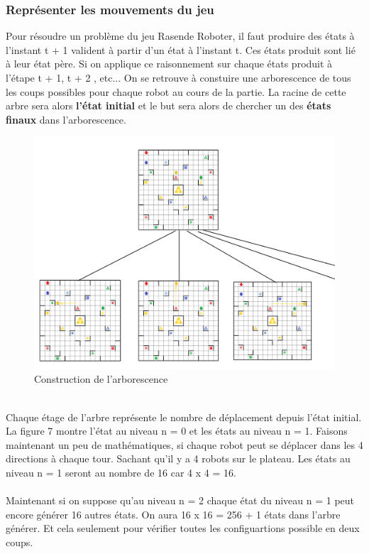 \documentclass{article}
\begin{document}
\subsubsection{Représenter les mouvements du jeu}
Pour résoudre un problème du jeu Rasende Roboter, il faut produire des états à l'instant t + 1 valident à partir d'un état à l'instant t. Ces états produit sont lié à leur état père. Si on applique ce raisonnement sur chaque états produit à l'étape t + 1, t + 2 , etc... On se retrouve à constuire une arborescence de tous les coups possibles pour chaque robot au cours de la partie. La racine de cette arbre sera alors \textbf{l'état initial} et le but sera alors de chercher un des \textbf{états finaux} dans l'arborescence.
\begin{figure}[htbp]
  \centering  
  \includegraphics[width=1\textwidth]{arbre.png}  
  \caption{Construction de l'arborescence} 
  \label{fig:Arborescence}  
\end{figure}\\
Chaque étage de l'arbre représente le nombre de déplacement depuis l'état initial. La figure 7 montre l'état au niveau n = 0 et les états au niveau n = 1. Faisons maintenant un peu de mathématiques, si chaque robot peut se déplacer dans les 4 directions à chaque tour. Sachant qu'il y a 4 robots sur le plateau. Les états au niveau n = 1 seront au nombre de 16 car 4 x 4 = 16.\\\\
Maintenant si on suppose qu'au niveau n = 2 chaque état du niveau n = 1 peut encore générer 16 autres états. On aura 16 x 16 = 256 + 1 états dans l'arbre générer. Et cela seulement pour vérifier toutes les configuartions possible en deux coups.\\\\
\end{document}
